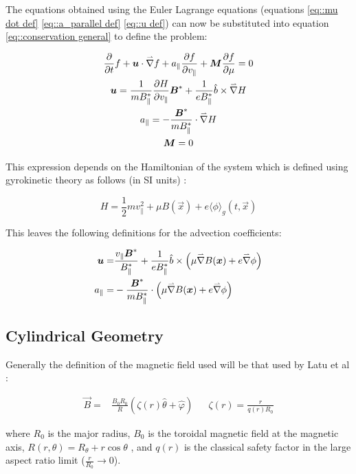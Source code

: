 The equations obtained using the Euler Lagrange equations (equations \ref{eq::mu dot def} \ref{eq::a_parallel def} \ref{eq::u def}) can now be substituted into equation \ref{eq::conservation general} to define the problem:

\begin{gather}
 \frac{\partial }{\partial t}f + \boldsymbol{u}\cdot\accentset{\rightharpoonup}{\nabla} f + a_\parallel \frac{\partial f}{\partial v_\parallel} + \boldsymbol{M} \frac{\partial f}{\partial \mu} = 0\\
 \boldsymbol{u} = \frac{1}{mB_\parallel^*}\frac{\partial H}{\partial v_\parallel}\boldsymbol{B}^* + \frac{1}{eB_\parallel^*} \hat{b}\times\accentset{\rightharpoonup}{\nabla} H\\
 a_\parallel = - \frac{\boldsymbol{B}^*}{mB_\parallel^*}\cdot\accentset{\rightharpoonup}{\nabla} H\\
 \boldsymbol{M}=0
\end{gather}

This expression depends on the Hamiltonian of the system which is defined using gyrokinetic theory as follows (in SI units) \cite{YamanPaper}: 

\begin{equation}
 H=\frac{1}{2}mv_\parallel^2 + \mu B(\vec{x})+e\langle\phi\rangle_g(t,\vec{x})
\end{equation}

This leaves the following definitions for the advection coefficients:

\begin{align}
 \boldsymbol{u} =& \frac{v_\parallel\boldsymbol{B}^*}{B_\parallel^*} + \frac{1}{eB_\parallel^*} \hat{b}\times\left(\mu\accentset{\rightharpoonup}{\nabla} B(\boldsymbol{x})+e\accentset{\rightharpoonup}{\nabla}\phi\right) \label{eq::General u}\\
 a_\parallel =& - \frac{\boldsymbol{B}^*}{mB_\parallel^*}\cdot\left(\mu\accentset{\rightharpoonup}{\nabla} B(\boldsymbol{x})+e\accentset{\rightharpoonup}{\nabla}\phi\right)\label{eq::General a parallel}
\end{align}

\subsection{Cylindrical Geometry}

Generally the definition of the magnetic field used will be that used by Latu et al \cite{YamanPaper}:

\begin{align}
 \vec{B}=&\frac{B_0R_0}{R}\left(\zeta(r)\hat{\theta}+\hat{\varphi}\right) &&
 \zeta(r)=\frac{r}{q(r)R_0}
\end{align}

where $R_0$ is the major radius, $B_0$ is the toroidal magnetic field at the magnetic axis, $R(r,\theta) = R_\theta + r \cos\theta$ , and $q(r)$ is the classical safety factor in the large aspect ratio limit ($\frac{r}{R_0}\rightarrow 0$).

